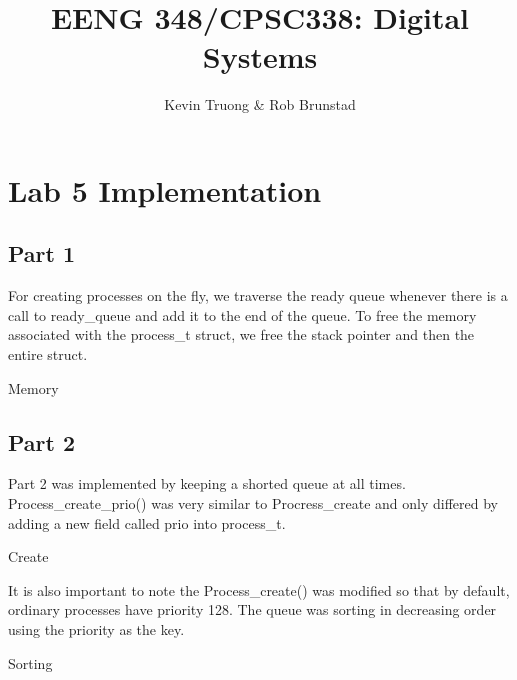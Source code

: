 \documentclass[12pt]{article}
\begin{document}
\title{EENG 348/CPSC338: Digital Systems}
\author{Kevin Truong \& Rob Brunstad} 
\maketitle
\section{Lab 5 Implementation}
\subsection{Part 1}

For creating processes on the fly, we traverse the ready queue whenever there 
is a call to ready\_queue and add it to the end of the queue. To free the memory
associated with the process\_t struct, we free the stack pointer and then the 
entire struct. 
\begin{algorithm}[!h]
\caption{Memory}
\begin{algorithmic}[1]
    \EndProcedure{}
\end{algorithmic}
\end{algorithm}

\subsection{Part 2}
Part 2 was implemented by keeping a shorted queue at all times. Process\_create\_prio()
was very similar to Procress\_create and only differed by adding a new field 
called prio into process\_t. 
\begin{algorithm}[!h]
\caption{Create}
\begin{algorithmic}[1]
    \EndProcedure{}
\end{algorithmic}
\end{algorithm}
It is also important to note the Process\_create() was modified so that by default,
ordinary processes have priority 128. The queue was sorting in decreasing order using the priority as the key. 
\begin{algorithm}[!h]
\caption{Sorting}
\begin{algorithmic}[1]
        \Else{}
        \EndIf{}
    \EndProcedure{}
\end{algorithmic}
\end{algorithm}
\end{document}

